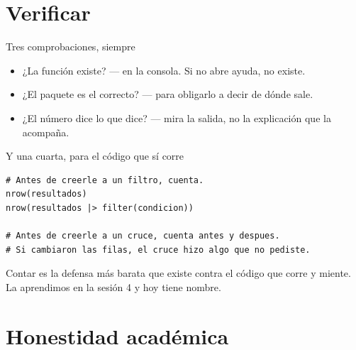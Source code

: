 \section{Verificar}

\begin{frame}{Tres comprobaciones, siempre}
  \vspace{0.4em}
  \begin{itemize}\setlength{\itemsep}{1.0em}
    \item<1-> \ac{¿La función existe?} —  en la consola.
          Si no abre ayuda, no existe.
    \item<2-> \ac{¿El paquete es el correcto?} — 
          para obligarlo a decir de dónde sale.
    \item<3-> \ac{¿El número dice lo que dice?} — mira la salida, no la
          explicación que la acompaña.
  \end{itemize}

  \vspace{1.2em}
\end{frame}

\begin{frame}[fragile]{Y una cuarta, para el código que sí corre}
\begin{lstlisting}
# Antes de creerle a un filtro, cuenta.
nrow(resultados)
nrow(resultados |> filter(condicion))

# Antes de creerle a un cruce, cuenta antes y despues.
# Si cambiaron las filas, el cruce hizo algo que no pediste.
\end{lstlisting}

  \vspace{0.6em}
  Contar es la defensa más barata que existe contra el código que corre y
  miente. La aprendimos en la sesión 4 y hoy tiene nombre.
\end{frame}

\section{Honestidad académica}

